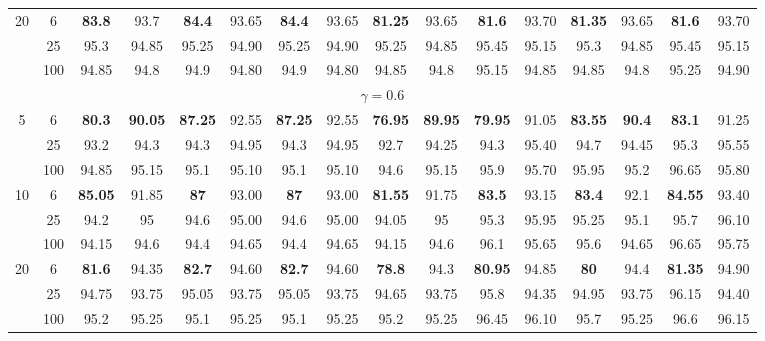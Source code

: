 \documentclass[
  man]{apa6}
\newenvironment{lltable}{\begin{landscape}\centering\begin{ThreePartTable}}{\end{ThreePartTable}\end{landscape}}
\begin{document}
\begin{lltable}
{\begin{longtable}{cccccccccccccccc}
20 & 6 & \textbf{83.8} & 93.7 & \textbf{84.4} & 93.65 & \textbf{84.4} & 93.65 & \textbf{81.25} & 93.65 & \textbf{81.6} & 93.70 & \textbf{81.35} & 93.65 & \textbf{81.6} & 93.70\\
 & 25 & 95.3 & 94.85 & 95.25 & 94.90 & 95.25 & 94.90 & 95.25 & 94.85 & 95.45 & 95.15 & 95.3 & 94.85 & 95.45 & 95.15\\
 & 100 & 94.85 & 94.8 & 94.9 & 94.80 & 94.9 & 94.80 & 94.85 & 94.8 & 95.15 & 94.85 & 94.85 & 94.8 & 95.25 & 94.90\\
\multicolumn{16}{c}{$\gamma = 0.6$}\\
5 & 6 & \textbf{80.3} & \textbf{90.05} & \textbf{87.25} & 92.55 & \textbf{87.25} & 92.55 & \textbf{76.95} & \textbf{89.95} & \textbf{79.95} & 91.05 & \textbf{83.55} & \textbf{90.4} & \textbf{83.1} & 91.25\\
 & 25 & 93.2 & 94.3 & 94.3 & 94.95 & 94.3 & 94.95 & 92.7 & 94.25 & 94.3 & 95.40 & 94.7 & 94.45 & 95.3 & 95.55\\
 & 100 & 94.85 & 95.15 & 95.1 & 95.10 & 95.1 & 95.10 & 94.6 & 95.15 & 95.9 & 95.70 & 95.95 & 95.2 & 96.65 & 95.80\\
10 & 6 & \textbf{85.05} & 91.85 & \textbf{87} & 93.00 & \textbf{87} & 93.00 & \textbf{81.55} & 91.75 & \textbf{83.5} & 93.15 & \textbf{83.4} & 92.1 & \textbf{84.55} & 93.40\\
 & 25 & 94.2 & 95 & 94.6 & 95.00 & 94.6 & 95.00 & 94.05 & 95 & 95.3 & 95.95 & 95.25 & 95.1 & 95.7 & 96.10\\
 & 100 & 94.15 & 94.6 & 94.4 & 94.65 & 94.4 & 94.65 & 94.15 & 94.6 & 96.1 & 95.65 & 95.6 & 94.65 & 96.65 & 95.75\\
20 & 6 & \textbf{81.6} & 94.35 & \textbf{82.7} & 94.60 & \textbf{82.7} & 94.60 & \textbf{78.8} & 94.3 & \textbf{80.95} & 94.85 & \textbf{80} & 94.4 & \textbf{81.35} & 94.90\\
 & 25 & 94.75 & 93.75 & 95.05 & 93.75 & 95.05 & 93.75 & 94.65 & 93.75 & 95.8 & 94.35 & 94.95 & 93.75 & 96.15 & 94.40\\
 & 100 & 95.2 & 95.25 & 95.1 & 95.25 & 95.1 & 95.25 & 95.2 & 95.25 & 96.45 & 96.10 & 95.7 & 95.25 & 96.6 & 96.15\\
\bottomrule
\end{longtable}

}

\end{lltable}
\end{document}
